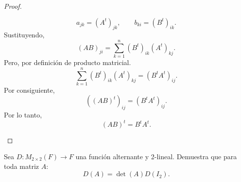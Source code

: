 \documentclass[12pt,a4paper]{article}
\begin{document}
\begin{proof}
\begin{enumerate}
\begin{equation*}
                a_{jk}=(A^{t})_{jk},\qquad b_{ki}=(B^{t})_{ik}.
            \end{equation*}
            Sustituyendo,
            \begin{equation*}
                (AB)_{ji}=\sum_{k=1}^{n}(B^{t})_{ik}(A^{t})_{kj}.
            \end{equation*}
            Pero, por definición de producto matricial.
            \begin{equation*}
                \sum_{k=1}^{n}(B^{t})_{ik}(A^{t})_{kj}=(B^{t}A^{t})_{ij}.
            \end{equation*}
            Por consiguiente,
            \begin{equation*}
                ((AB)^{t})_{ij}=(B^{t}A^{t})_{ij}.
            \end{equation*}
            Por lo tanto,
            \begin{equation*}
                (AB)^{t}=B^{t}A^{t}.
            \end{equation*}
        \end{enumerate}
    \end{proof}

    \begin{mdframed}[style=mdpinkbox,frametitle={Ejercicio 2}]
        Sea $D:M_{2\times2}(F)\to F$ una función alternante y 2-lineal. Demuestra que para toda
        matriz $A$:
        \begin{equation*}
            D(A)=\det(A)D(I_{2}).
        \end{equation*}
    \end{mdframed}
\end{document}
